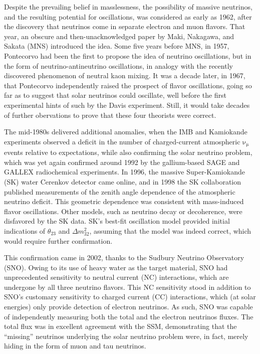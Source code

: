 \documentclass[../thesis.tex]{subfiles}
\begin{document}
Despite the prevailing belief in masslessness, the possibility of massive neutrinos, and the resulting potential for oscillations, was considered as early as 1962, after the discovery that neutrinos come in separate electron and muon flavors. That year, an obscure and then-unacknowledged paper by Maki, Nakagawa, and Sakata (MNS) introduced the idea. Some five years before MNS, in 1957, Pontecorvo had been the first to propose the idea of neutrino oscillations, but in the form of neutrino-antineutrino oscillations, in analogy with the recently discovered phenomenon of neutral kaon mixing. It was a decade later, in 1967, that Pontecorvo independently raised the prospect of flavor oscillations, going so far as to suggest that solar neutrinos could oscillate, well before the first experimental hints of such by the Davis experiment. Still, it would take decades of further obervations to prove that these four theorists were correct.

The mid-1980s delivered additional anomalies, when the IMB and Kamiokande experiments observed a deficit in the number of charged-current atmospheric $\mathrm{\nu_\mu}$ events relative to expectations, while also confirming the solar neutrino problem, which was yet again confirmed around 1992 by the gallium-based SAGE and GALLEX radiochemical experiments. In 1996, the massive Super-Kamiokande (SK) water Cerenkov detector came online, and in 1998 the SK collaboration published measurements of the zenith angle dependence of the atmospheric neutrino deficit. This geometric dependence was consistent with mass-induced flavor oscillations. Other models, such as neutrino decay or decoherence, were disfavored by the SK data. SK's best-fit oscillation model provided initial indications of $\theta_{23}$ and $\Delta m^2_{32}$, assuming that the model was indeed correct, which would require further confirmation. 

This confirmation came in 2002, thanks to the Sudbury Neutrino Observatory (SNO). Owing to its use of heavy water as the target material, SNO had unprecedented sensitivity to neutral current (NC) interactions, which are undergone by all three neutrino flavors. This NC sensitivity stood in addition to SNO's customary sensitivity to charged current (CC) interactions, which (at solar energies) only provide detection of electron neutrinos. As such, SNO was capable of independently measuring both the total and the electron neutrinos fluxes. The total flux was in excellent agreement with the SSM, demonstrating that the ``missing'' neutrinos underlying the solar neutrino problem were, in fact, merely hiding in the form of muon and tau neutrinos.
\end{document}
